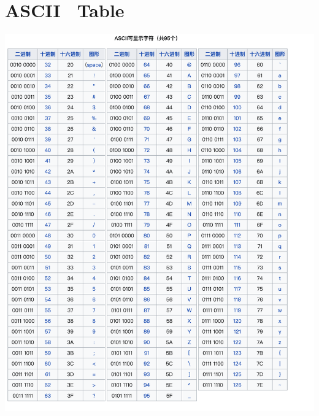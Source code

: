 \documentclass{article}
\begin{document}
\section{ASCII~ Table}
\begin{center}
  \includegraphics[height=.3\paperheight]{./ascii-1.png}

\end{center}
\end{document}
